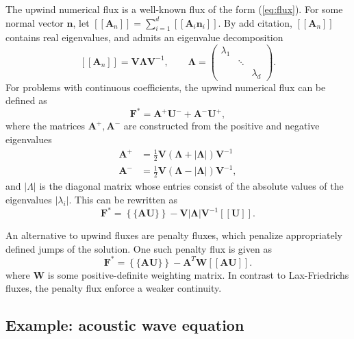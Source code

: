 \documentclass[10pt]{article}
\newcommand{\LRp}[1]{\left( #1 \right)}
\newcommand{\LRs}[1]{\left[ #1 \right]}
\newcommand{\LRb}[1]{\left| #1 \right|}
\newcommand{\LRc}[1]{\left\{ #1 \right\}}
\newcommand{\jump}[1] {\ensuremath{\LRs{\![#1]\!}}}
\newcommand{\avg}[1] {\ensuremath{\LRc{\!\{#1\}\!}}}
\newcommand{\note}[1]{{\color{blue}#1}}
\begin{document}
The upwind numerical flux is a well-known flux of the form (\ref{eq:flux}).  For some normal vector $\bm{n}$, let $\jump{\bm{A}_n} = \sum_{i=1}^d \jump{\bm{A}_i\bm{n}_i}$.  By \note{add citation}, $\jump{\bm{A}_n}$ contains real eigenvalues, and admits an eigenvalue decomposition
\[
\jump{\bm{A}_n} = \bm{V}{\bm{\Lambda}}\bm{V}^{-1}, \qquad \bm{\Lambda} = 
\left(\begin{array}{ccc}
\lambda_1 & & \\
& \ddots & \\
& & \lambda_d
\end{array}\right).
\]
For problems with continuous coefficients, the upwind numerical flux can be defined as
\[
\bm{F^*} = \bm{A}^+\bm{U}^- + \bm{A}^- \bm{U}^+,
\]
where the matrices $\bm{A}^+,\bm{A}^-$ are constructed from the positive and negative eigenvalues 
\begin{align*}
\bm{A}^+ &= \frac{1}{2}\bm{V} \LRp{\bm{\Lambda} + \LRb{\bm{\Lambda}}} \bm{V}^{-1}\\
\bm{A}^- &= \frac{1}{2}\bm{V} \LRp{\bm{\Lambda} - \LRb{\bm{\Lambda}}} \bm{V}^{-1},
\end{align*}
and $\LRb{\Lambda}$ is the diagonal matrix whose entries consist of the absolute values of the eigenvalues $\LRb{\lambda_i}$.  This can be rewritten as
\[
\bm{F^*} = \avg{\bm{A}\bm{U}} - \bm{V}\LRb{\bm{\Lambda}}\bm{V}^{-1} \jump{\bm{U}}.  
\]

An alternative to upwind fluxes are penalty fluxes, which penalize appropriately defined jumps of the solution.  One such penalty flux is given as
\[
\bm{F^*} = \avg{\bm{A}\bm{U}} - \bm{A}^T \bm{W} \jump{\bm{A}\bm{U}}.  
\]
where $\bm{W}$ is some positive-definite weighting matrix.  In contrast to Lax-Friedrichs fluxes, the penalty flux enforce a weaker continuity.  

\subsection{Example: acoustic wave equation}
\end{document}
